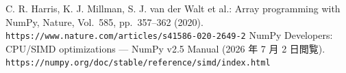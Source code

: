  C. R. Harris, K. J. Millman, S. J. van der Walt et al.: Array programming with NumPy, Nature, Vol.~585, pp.~357--362 (2020). {\tt https://www.nature.com/articles/s41586-020-2649-2}
 NumPy Developers: CPU/SIMD optimizations --- NumPy v2.5 Manual (2026 年 7 月 2 日閲覧). {\tt https://numpy.org/doc/stable/reference/simd/index.html}

